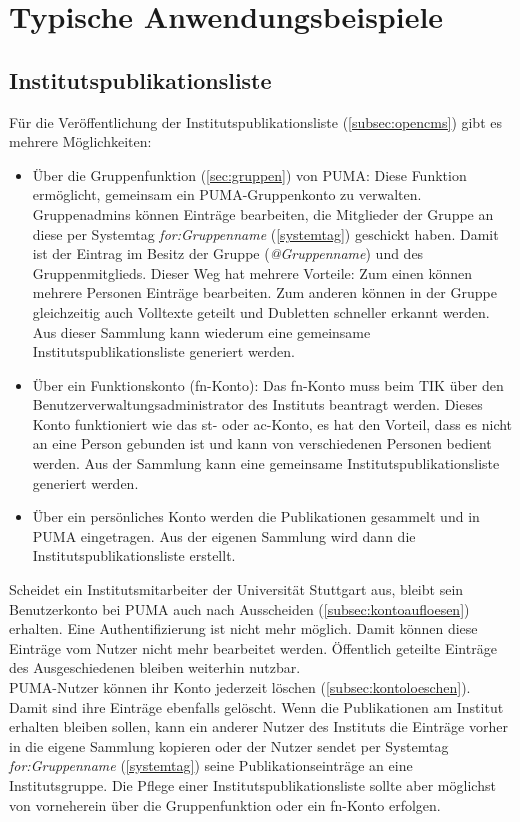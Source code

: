 \chapter{Typische Anwendungsbeispiele}
\label{ch:typischeAnwendungsbeispiele}

\section{Institutspublikationsliste}
\label{sec:institutspublikationsliste}
Für die Veröffentlichung der Institutspublikationsliste (\autoref{subsec:opencms}) gibt es mehrere Möglichkeiten:
\begin{itemize}
\item Über die Gruppenfunktion (\autoref{sec:gruppen}) von PUMA: Diese Funktion ermöglicht, gemeinsam ein PUMA-Gruppenkonto zu verwalten. Gruppenadmins können Einträge bearbeiten, die Mitglieder der Gruppe an diese per Systemtag \textit{for:Gruppenname} (\autoref{systemtag}) geschickt haben. Damit ist der Eintrag im Besitz der Gruppe (\textit{@Gruppenname}) und des Gruppenmitglieds. Dieser Weg hat mehrere Vorteile: Zum einen können mehrere Personen Einträge bearbeiten. Zum anderen können in der Gruppe gleichzeitig auch Volltexte geteilt und Dubletten schneller erkannt werden. Aus dieser  Sammlung kann wiederum eine gemeinsame Institutspublikationsliste generiert werden.
\item Über ein Funktionskonto (fn-Konto): Das fn-Konto muss beim TIK über den Benutzerverwaltungsadministrator des Instituts beantragt werden. Dieses Konto funktioniert wie das st- oder ac-Konto, es hat den Vorteil, dass es nicht an eine Person gebunden ist und kann von verschiedenen Personen bedient werden. Aus der Sammlung kann eine gemeinsame Institutspublikationsliste generiert werden.
\item Über ein persönliches Konto werden die Publikationen gesammelt und in PUMA eingetragen. Aus der eigenen Sammlung wird dann die Institutspublikationsliste erstellt.
\end{itemize}
Scheidet ein Institutsmitarbeiter der Universität Stuttgart aus, bleibt sein Benutzerkonto bei PUMA auch nach Ausscheiden (\autoref{subsec:kontoaufloesen}) erhalten. Eine Authentifizierung ist nicht mehr möglich. Damit können diese Einträge vom Nutzer nicht mehr bearbeitet werden. Öffentlich geteilte Einträge des Ausgeschiedenen bleiben weiterhin nutzbar.\\
PUMA-Nutzer können ihr Konto jederzeit löschen (\autoref{subsec:kontoloeschen}). Damit sind ihre Einträge ebenfalls gelöscht. Wenn die Publikationen am Institut erhalten bleiben sollen, kann ein anderer Nutzer des Instituts die Einträge vorher in die eigene Sammlung kopieren oder der Nutzer sendet per Systemtag \textit{for:Gruppenname} (\autoref{systemtag}) seine Publikationseinträge an eine Institutsgruppe. Die Pflege einer Institutspublikationsliste sollte aber möglichst von vorneherein über die Gruppenfunktion oder ein fn-Konto erfolgen.

